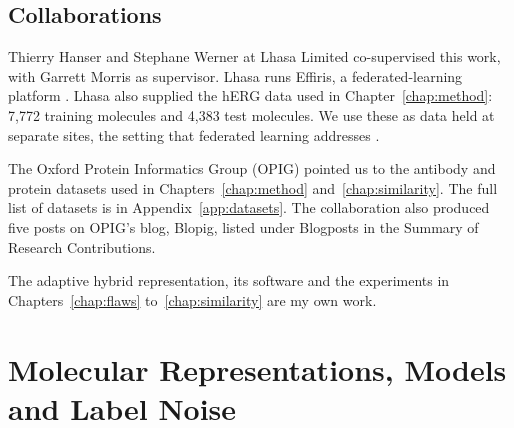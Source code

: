 \section{Collaborations}


Thierry Hanser and Stephane Werner at Lhasa Limited co-supervised this work, with Garrett Morris as supervisor. Lhasa runs Effiris, a federated-learning platform \citep{Bassani2023}. Lhasa also supplied the hERG data used in Chapter~\ref{chap:method}: 7,772 training molecules and 4,383 test molecules. We use these as data held at separate sites, the setting that federated learning addresses \citep{Bassani2023, Hanser2023}.

The Oxford Protein Informatics Group (OPIG) pointed us to the antibody and protein datasets used in Chapters~\ref{chap:method} and~\ref{chap:similarity}. The full list of datasets is in Appendix~\ref{app:datasets}. The collaboration also produced five posts on OPIG's blog, Blopig, listed under Blogposts in the Summary of Research Contributions.

The adaptive hybrid representation, its software and the experiments in Chapters~\ref{chap:flaws} to~\ref{chap:similarity} are my own work.



\pagebreak
\chapter{Molecular Representations, Models and Label Noise}\label{chap:background}\label{sec2}

